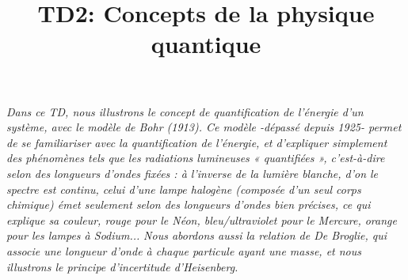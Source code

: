 \documentclass{article}
\author{}
\date{}
\title{TD2: Concepts de la physique quantique}
\begin{document}
\maketitle
\textit{Dans ce TD, nous illustrons le concept de quantification de l'énergie d'un système, avec le modèle de Bohr (1913). Ce modèle -dépassé depuis 1925- permet de se familiariser avec la quantification de l'énergie, et d'expliquer simplement des phénomènes tels que les radiations lumineuses « quantifiées », c'est-à-dire selon des longueurs d'ondes fixées : à l'inverse de la lumière blanche, d'on le spectre est continu, celui d'une lampe halogène (composée d'un seul corps chimique) émet seulement selon des longueurs d'ondes bien précises, ce qui explique sa couleur, rouge pour le Néon, bleu/ultraviolet pour le Mercure, orange pour les lampes à Sodium...}\newline
\textit{Nous abordons aussi la relation de De Broglie, qui associe une longueur d'onde à chaque particule ayant une masse, et nous illustrons le principe d'incertitude d'Heisenberg.}\newline\newline
\end{document}
